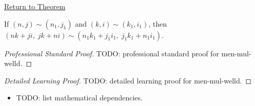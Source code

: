 \newpage
{}
\label{prf:men-mul-welld}

\begin{remark*}[Return]
\hyperref[lem:men-mul-welld]{Return to Theorem}
\end{remark*}

\begin{lemma*}
If $(n,j) \sim (n_1,j_1)$ and $(k,i) \sim (k_1,i_1)$, then
$(nk+ji,\; jk+ni) \sim (n_1k_1+j_1i_1,\; j_1k_1+n_1i_1)$.
\end{lemma*}

\begin{proof}[Professional Standard Proof]
\LRAProofBodyStart
TODO: professional standard proof for men-mul-welld.
\end{proof}

\begin{proof}[Detailed Learning Proof]
\LRAProofBodyStart
TODO: detailed learning proof for men-mul-welld.
\end{proof}

\begin{remark*}
\end{remark*}

\begin{dependencies}
\begin{itemize}
  \item TODO: list mathematical dependencies.
\end{itemize}
\end{dependencies}

\clearpage
